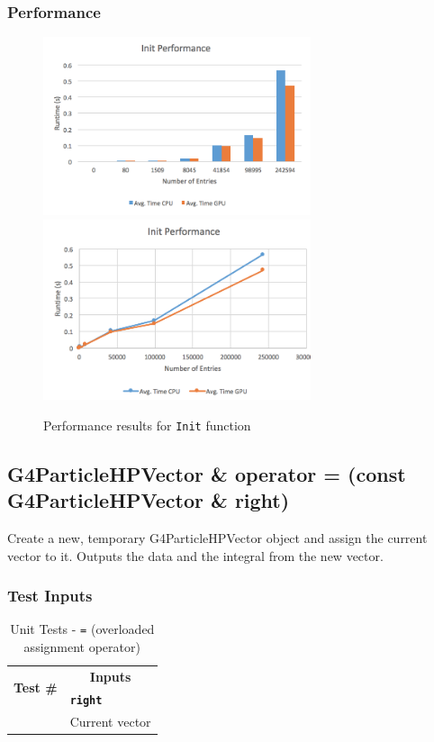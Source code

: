 \documentclass[12pt]{article}
\newcounter{TestCounter}
\begin{document}
	\subsubsection{Performance}
    	\begin{figure}[H]
    	\centering
    	\caption{Performance results for \texttt{Init} function}\label{figPerformanceInit}
    	\includegraphics[width=0.7\textwidth]{init_bar.png}
    	\includegraphics[width=0.7\textwidth]{init_line.png}
   		\end{figure}

\subsection{G4ParticleHPVector \& operator = (const G4ParticleHPVector \& right)}
	Create a new, temporary G4ParticleHPVector object and assign the current vector to it. Outputs the data and the integral from the new vector.

	\subsubsection{Test Inputs}
		\begin{table}[H]
		\centering
		\caption{Unit Tests - \texttt{=} (overloaded assignment operator)}\label{OperatorEquals_unit}
		\begin{tabular}{cl}
		\toprule
		\multirow{2}{*}{\bf Test \#}  & \multicolumn{1}{c}{\bf Inputs}\\
		& \bf \texttt{right}\\\midrule
		{TestCounter}\arabic{TestCounter}\label{OperatorEquals_0} & Current vector\\
		\bottomrule
		\end{tabular}
		\end{table}	
		
\end{document}
